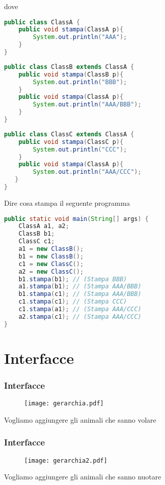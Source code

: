 \documentclass{beamer}
\begin{document}
\begin{frame}[fragile]
dove 
\begin{lstlisting}[language=Java,escapechar=|]
public class ClassA {
    public void stampa(ClassA p){
        System.out.println("AAA");
    }
}
\end{lstlisting}
\begin{lstlisting}[language=Java,escapechar=|]
public class ClassB extends ClassA {
    public void stampa(ClassB p){
        System.out.println("BBB");
    }
    public void stampa(ClassA p){
	    System.out.println("AAA/BBB");
	}
}
\end{lstlisting}
\begin{lstlisting}[language=Java,escapechar=|]
public class ClassC extends ClassA {
    public void stampa(ClassC p){
        System.out.println("CCC");
    }
    public void stampa(ClassA p){
        System.out.println("AAA/CCC");
   }
}
\end{lstlisting}
\end{frame}


\begin{frame}[fragile]
Dire cosa stampa il seguente programma 
\begin{lstlisting}[language=Java,escapechar=|]
public static void main(String[] args) {
    ClassA a1, a2;
    ClassB b1;
    ClassC c1;
    a1 = new ClassB();
    b1 = new ClassB();
    c1 = new ClassC();
    a2 = new ClassC();
    b1.stampa(b1); // (Stampa BBB)
    a1.stampa(b1); // (Stampa AAA/BBB)
    b1.stampa(c1); // (Stampa AAA/BBB)
    c1.stampa(c1); // (Stampa CCC)
    c1.stampa(a1); // (Stampa AAA/CCC)
    a2.stampa(c1); // (Stampa AAA/CCC)
}
\end{lstlisting}
\end{frame}



\section{Interfacce}
\begin{frame}[fragile]
\frametitle{Interfacce}
\begin{figure}[h!]
  \centering
    \texttt{[image: gerarchia.pdf]}
\end{figure}
Vogliamo aggiungere gli animali che sanno volare
\end{frame}

\begin{frame}[fragile]
\frametitle{Interfacce}
\begin{figure}[h!]
  \centering
    \texttt{[image: gerarchia2.pdf]}
\end{figure}
Vogliamo aggiungere gli animali che sanno nuotare
\end{frame}
\end{document}
